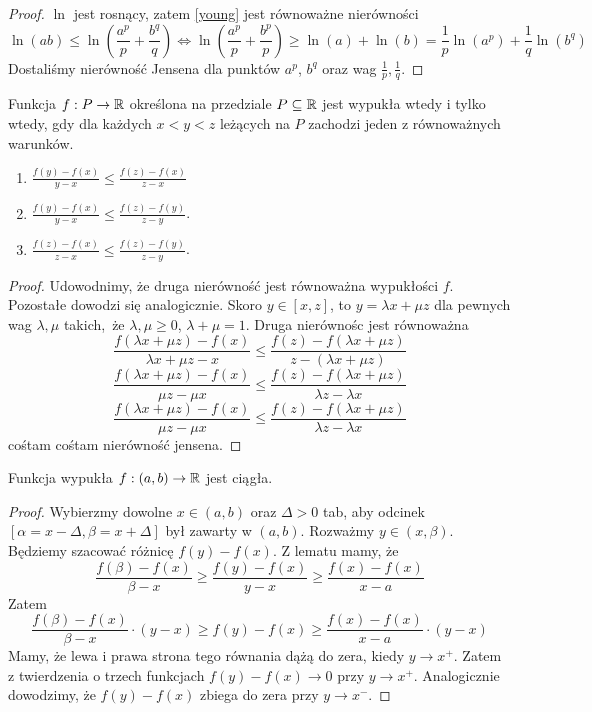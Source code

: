 \documentclass[9pt]{article}
\begin{document}
\begin{proof}
    $\ln$ jest rosnący, zatem \eqref{young} jest równoważne nierówności
    \[
        \ln (ab) \le \ln \left(\frac{a^p}{p} + \frac{b^q}{q}\right) \iff
        \ln \left(\frac{a^p}{p} + \frac{b^p}{p}\right)
        \ge
        \ln (a) + \ln (b)
        =
        \frac{1}{p} \ln\left(a^p\right) + \frac{1}{q} \ln \left(b^q\right)
    \]
    Dostaliśmy nierówność Jensena dla punktów $a^p$, $b^q$ oraz wag
    $\frac{1}{p}, \frac{1}{q}$.
\end{proof}

\begin{Lem}
    Funkcja $f: P \to \mathbb{R}$ określona na przedziale $P \subseteq \mathbb{R}$ jest wypukła wtedy i tylko wtedy,
    gdy dla każdych $x < y < z$ leżących na $P$ zachodzi jeden z równoważnych warunków.
    \begin{enumerate}
        \item $\frac{f(y)-f(x)}{y-x} \le \frac{f(z)-f(x)}{z-x}$
        \item $\frac{f(y)-f(x)}{y-x} \le \frac{f(z)-f(y)}{z-y}$.
        \item $\frac{f(z)-f(x)}{z-x} \le \frac{f(z)-f(y)}{z-y}$.
    \end{enumerate}
\end{Lem}

\begin{proof}
    Udowodnimy, że druga nierówność jest równoważna wypukłości $f$. Pozostałe dowodzi się
    analogicznie. Skoro $y \in [x,z]$, to $y = \lambda x + \mu z$ dla pewnych wag $\lambda, \mu$
    takich, że $\lambda, \mu \ge 0$, $\lambda+\mu = 1$. Druga nierównośc jest równoważna
    \[
        \frac{f(\lambda x + \mu z) - f(x)}{\lambda x + \mu z - x}
        \le
        \frac{f(z)-f(\lambda x + \mu z)}{z - (\lambda x + \mu z)}
    \]
    \[
        \frac{f(\lambda x + \mu z) - f(x)}{\mu z - \mu x}
        \le
        \frac{f(z)-f(\lambda x + \mu z)}{\lambda z - \lambda x}
    \]
    \[
        \frac{f(\lambda x + \mu z) - f(x)}{\mu z - \mu x}
        \le
        \frac{f(z)-f(\lambda x + \mu z)}{\lambda z - \lambda x}
    \]
    cośtam cośtam nierówność jensena.
\end{proof}

\begin{Twi}
    Funkcja wypukła $f: (a,b) \to \mathbb{R}$ jest ciągła. 
\end{Twi}

\begin{proof}
    Wybierzmy dowolne $x \in (a, b)$ oraz $\Delta > 0$ tab, aby odcinek
    $[\alpha = x - \Delta, \beta = x + \Delta]$ był zawarty w $(a,b)$. Rozważmy
    $y \in (x, \beta)$. Będziemy szacować różnicę $f(y) - f(x)$. Z lematu mamy, że
    \[
        \frac{f(\beta) - f(x)}{\beta-x} \ge \frac{f(y)-f(x)}{y-x} \ge \frac{f(x)-f(x)}{x-a}
    \]
    Zatem
    \[
        \frac{f(\beta) - f(x)}{\beta-x} \cdot (y-x)
        \ge f(y)-f(x) \ge
        \frac{f(x)-f(x)}{x-a} \cdot (y-x)
    \]
    Mamy, że lewa i prawa strona tego równania dążą do zera, kiedy
    $y \to x^+$. Zatem z twierdzenia o trzech funkcjach $f(y)-f(x) \to 0$ przy $y \to x^+$.
    Analogicznie dowodzimy, że $f(y)-f(x)$ zbiega do zera przy $y \to x^-$.
\end{proof}
\end{document}
